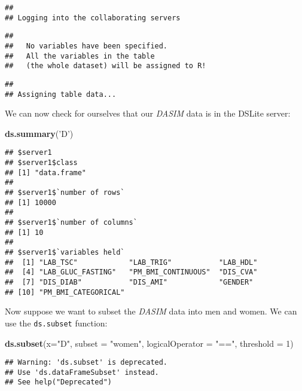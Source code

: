 \documentclass[
]{book}
\newenvironment{Shaded}{\begin{snugshade}}{\end{snugshade}}
\newcommand{\DataTypeTok}[1]{\textcolor[rgb]{0.13,0.29,0.53}{#1}}
\newcommand{\DecValTok}[1]{\textcolor[rgb]{0.00,0.00,0.81}{#1}}
\newcommand{\KeywordTok}[1]{\textcolor[rgb]{0.13,0.29,0.53}{\textbf{#1}}}
\newcommand{\NormalTok}[1]{#1}
\newcommand{\StringTok}[1]{\textcolor[rgb]{0.31,0.60,0.02}{#1}}
\begin{document}
\begin{verbatim}
## 
## Logging into the collaborating servers
\end{verbatim}

\begin{verbatim}
## 
##   No variables have been specified. 
##   All the variables in the table 
##   (the whole dataset) will be assigned to R!
\end{verbatim}

\begin{verbatim}
## 
## Assigning table data...
\end{verbatim}

We can now check for ourselves that our \emph{DASIM} data is in the DSLite server:

\begin{Shaded}
\begin{Highlighting}[]
\KeywordTok{ds.summary}\NormalTok{(}\StringTok{'D'}\NormalTok{)}
\end{Highlighting}
\end{Shaded}

\begin{verbatim}
## $server1
## $server1$class
## [1] "data.frame"
## 
## $server1$`number of rows`
## [1] 10000
## 
## $server1$`number of columns`
## [1] 10
## 
## $server1$`variables held`
##  [1] "LAB_TSC"            "LAB_TRIG"           "LAB_HDL"           
##  [4] "LAB_GLUC_FASTING"   "PM_BMI_CONTINUOUS"  "DIS_CVA"           
##  [7] "DIS_DIAB"           "DIS_AMI"            "GENDER"            
## [10] "PM_BMI_CATEGORICAL"
\end{verbatim}

Now suppose we want to subset the \emph{DASIM} data into men and women. We can use the \texttt{ds.subset} function:

\begin{Shaded}
\begin{Highlighting}[]
\KeywordTok{ds.subset}\NormalTok{(}\DataTypeTok{x=}\StringTok{"D"}\NormalTok{, }\DataTypeTok{subset =} \StringTok{"women"}\NormalTok{, }\DataTypeTok{logicalOperator =} \StringTok{"=="}\NormalTok{, }\DataTypeTok{threshold =} \DecValTok{1}\NormalTok{)}
\end{Highlighting}
\end{Shaded}

\begin{verbatim}
## Warning: 'ds.subset' is deprecated.
## Use 'ds.dataFrameSubset' instead.
## See help("Deprecated")
\end{verbatim}
\end{document}
